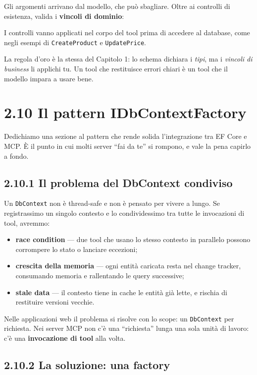 \documentclass[
  italian,
  10pt,
]{book}
\providecommand{\tightlist}{%
  \setlength{\itemsep}{0pt}\setlength{\parskip}{0pt}}
\begin{document}
Gli argomenti arrivano dal modello, che può sbagliare. Oltre ai
controlli di esistenza, valida i \textbf{vincoli di dominio}:

I controlli vanno applicati nel corpo del tool prima di accedere al
database, come negli esempi di \texttt{CreateProduct} e
\texttt{UpdatePrice}.

La regola d'oro è la stessa del Capitolo 1: lo schema dichiara i
\emph{tipi}, ma i \emph{vincoli di business} li applichi tu. Un tool che
restituisce errori chiari è un tool che il modello impara a usare bene.

\section{2.10 Il pattern
IDbContextFactory}\label{il-pattern-idbcontextfactory}

Dedichiamo una sezione al pattern che rende solida l'integrazione tra EF
Core e MCP. È il punto in cui molti server ``fai da te'' si rompono, e
vale la pena capirlo a fondo.

\subsection{2.10.1 Il problema del DbContext
condiviso}\label{il-problema-del-dbcontext-condiviso}

Un \texttt{DbContext} non è thread-safe e non è pensato per vivere a
lungo. Se registrassimo un singolo contesto e lo condividessimo tra
tutte le invocazioni di tool, avremmo:

\begin{itemize}
\tightlist
\item
  \textbf{race condition} --- due tool che usano lo stesso contesto in
  parallelo possono corrompere lo stato o lanciare eccezioni;
\item
  \textbf{crescita della memoria} --- ogni entità caricata resta nel
  change tracker, consumando memoria e rallentando le query successive;
\item
  \textbf{stale data} --- il contesto tiene in cache le entità già
  lette, e rischia di restituire versioni vecchie.
\end{itemize}

Nelle applicazioni web il problema si risolve con lo scope: un
\texttt{DbContext} per richiesta. Nei server MCP non c'è una
``richiesta'' lunga una sola unità di lavoro: c'è una
\textbf{invocazione di tool} alla volta.

\subsection{2.10.2 La soluzione: una
factory}\label{la-soluzione-una-factory}
\end{document}
